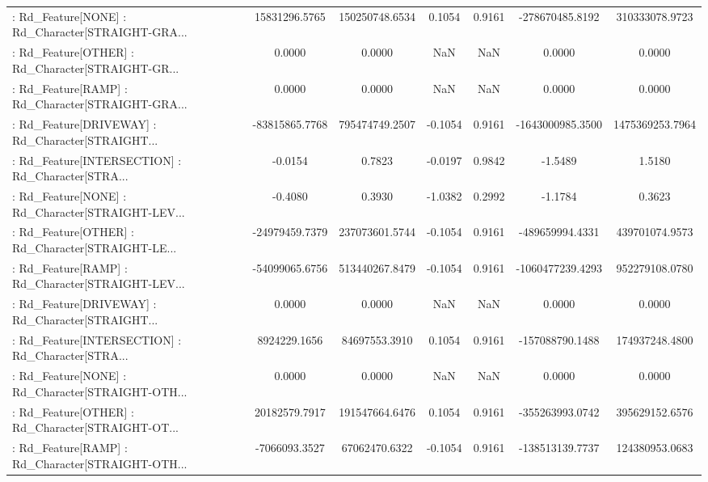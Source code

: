 \begin{longtable}{p{4cm}cccccc}
 : Rd\_Feature[NONE] : Rd\_Character[STRAIGHT-GRA... &     15831296.5765 &    150250748.6534 &  0.1054 &       0.9161 &    -278670485.8192 &    310333078.9723 \\
 : Rd\_Feature[OTHER] : Rd\_Character[STRAIGHT-GR... &            0.0000 &            0.0000 &     NaN &          NaN &             0.0000 &            0.0000 \\
 : Rd\_Feature[RAMP] : Rd\_Character[STRAIGHT-GRA... &            0.0000 &            0.0000 &     NaN &          NaN &             0.0000 &            0.0000 \\
 : Rd\_Feature[DRIVEWAY] : Rd\_Character[STRAIGHT... &    -83815865.7768 &    795474749.2507 & -0.1054 &       0.9161 &   -1643000985.3500 &   1475369253.7964 \\
 : Rd\_Feature[INTERSECTION] : Rd\_Character[STRA... &           -0.0154 &            0.7823 & -0.0197 &       0.9842 &            -1.5489 &            1.5180 \\
 : Rd\_Feature[NONE] : Rd\_Character[STRAIGHT-LEV... &           -0.4080 &            0.3930 & -1.0382 &       0.2992 &            -1.1784 &            0.3623 \\
 : Rd\_Feature[OTHER] : Rd\_Character[STRAIGHT-LE... &    -24979459.7379 &    237073601.5744 & -0.1054 &       0.9161 &    -489659994.4331 &    439701074.9573 \\
 : Rd\_Feature[RAMP] : Rd\_Character[STRAIGHT-LEV... &    -54099065.6756 &    513440267.8479 & -0.1054 &       0.9161 &   -1060477239.4293 &    952279108.0780 \\
 : Rd\_Feature[DRIVEWAY] : Rd\_Character[STRAIGHT... &            0.0000 &            0.0000 &     NaN &          NaN &             0.0000 &            0.0000 \\
 : Rd\_Feature[INTERSECTION] : Rd\_Character[STRA... &      8924229.1656 &     84697553.3910 &  0.1054 &       0.9161 &    -157088790.1488 &    174937248.4800 \\
 : Rd\_Feature[NONE] : Rd\_Character[STRAIGHT-OTH... &            0.0000 &            0.0000 &     NaN &          NaN &             0.0000 &            0.0000 \\
 : Rd\_Feature[OTHER] : Rd\_Character[STRAIGHT-OT... &     20182579.7917 &    191547664.6476 &  0.1054 &       0.9161 &    -355263993.0742 &    395629152.6576 \\
 : Rd\_Feature[RAMP] : Rd\_Character[STRAIGHT-OTH... &     -7066093.3527 &     67062470.6322 & -0.1054 &       0.9161 &    -138513139.7737 &    124380953.0683 \\

\end{longtable}

